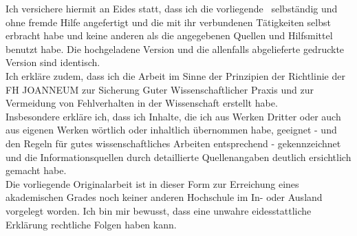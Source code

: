 %

\thispagestyle{empty}
 {\hfill\fontfamily{\sfdefault}\bfseries\fontsize{22}{22}\selectfont{Eidesstattliche Erklärung}}\vspace*{1cm}

\noindent Ich versichere hiermit an Eides statt, dass ich die vorliegende \DocTypeText ~selbständig und ohne fremde Hilfe angefertigt und die mit ihr verbundenen Tätigkeiten selbst erbracht habe und keine anderen als die angegebenen Quellen und Hilfsmittel benutzt habe. Die hochgeladene Version und die allenfalls abgelieferte gedruckte Version sind identisch.\\
\noindent Ich erkläre zudem, dass ich die Arbeit im Sinne der Prinzipien der Richtlinie der \nohyphens{FH JOANNEUM} zur Sicherung Guter Wissenschaftlicher Praxis und zur Vermeidung von Fehlverhalten in der Wissenschaft erstellt habe.\\
Insbesondere erkläre ich, dass ich Inhalte, die ich aus Werken Dritter oder auch aus eigenen Werken wörtlich oder inhaltlich übernommen habe, geeignet - und den Regeln für gutes wissenschaftliches Arbeiten entsprechend - gekennzeichnet und die Informationsquellen durch detaillierte Quellenangaben deutlich ersichtlich gemacht habe.\\
\noindent Die vorliegende Originalarbeit ist in dieser Form zur Erreichung eines akademischen Grades noch keiner anderen Hochschule im In- oder Ausland vorgelegt worden.
Ich bin mir bewusst, dass eine unwahre eidesstattliche Erklärung rechtliche Folgen haben kann.

\ifthenelse{\equal{\Style}{\Book}}
{
	\newpage\null\thispagestyle{empty}\newpage
}
{
}


